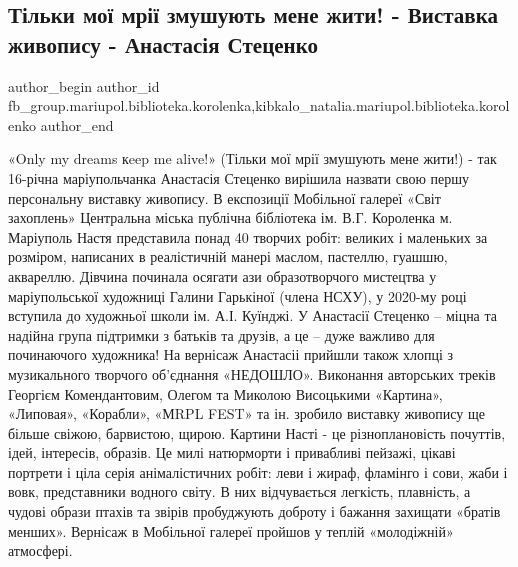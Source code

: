  
 
 
 
 

\subsection{Тільки мої мрії змушують мене жити! - Виставка живопису - Анастасія Стеценко}
\label{sec:07_07_2021.fb.fb_group.mariupol.biblioteka.korolenka.1.t_lki_mo__mr__zmush}
 
\ifcmt
 author_begin
   author_id fb_group.mariupol.biblioteka.korolenka,kibkalo_natalia.mariupol.biblioteka.korolenko
 author_end
\fi

«Only my dreams кeep me alive!» (Тільки мої мрії змушують мене жити!) - так
16-річна маріупольчанка Анастасія Стеценко вирішила назвати свою першу
персональну виставку живопису. В експозиції Мобільної галереї «Світ захоплень»
Центральна міська публічна бібліотека ім. В.Г. Короленка м. Маріуполь Настя
представила понад 40 творчих робіт: великих і маленьких за розміром, написаних
в реалістичній манері маслом, пастеллю, гуашшю, аквареллю. Дівчина починала
осягати ази образотворчого мистецтва у маріупольської художниці Галини
Гарькіної (члена НСХУ), у 2020-му році вступила до художньої школи ім. А.І.
Куїнджі. У Анастасії Стеценко – міцна та надійна група підтримки з батьків та
друзів, а це – дуже важливо для починаючого художника! На вернісаж Анастасіі
прийшли також хлопці з музикального творчого об'єднання «НЕДОШЛО». Виконання
авторських треків Георгієм Комендантовим, Олегом та Миколою Висоцькими
«Картина», «Липовая», «Корабли», «МRPL FEST» та ін. зробило виставку живопису
ще більше свіжою, барвистою, щирою. Картини Насті - це різноплановість
почуттів, ідей, інтересів, образів. Це милі натюрморти і привабливі пейзажі,
цікаві портрети і ціла серія анімалістичних робіт: леви і жираф, фламінго і
сови, жаби і вовк, представники водного світу. В них відчувається легкість,
плавність, а чудові образи птахів та звірів пробуджують доброту і бажання
захищати «братів менших». Вернісаж в Мобільної галереї пройшов у теплій
«молодіжній» атмосфері.
